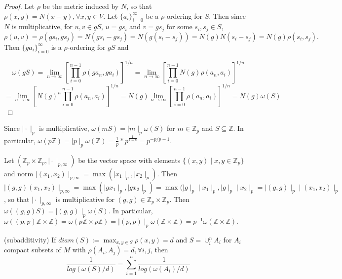 \begin{proof}
	Let $\rho$ be the metric induced by $N$, so that $\rho(x,y) = N(x-y), \forall x,y \in V$. Let $\{a_i\}_{i=0}^\infty$ be a $\rho$-ordering for $S$. Then since $N$ is multiplicative, for $u, v \in gS$, $u=gs_i$ and $v=gs_j$ for some $s_i, s_j \in S$,  $$\rho(u, v) = \rho(gs_i, gs_j) =N(gs_i - gs_j) = N(g(s_i - s_j)) = N(g)N(s_i - s_j) = N(g)\rho(s_i,s_j).$$
	Then $\{ga_i\}_{i=0}^\infty$ is a $\rho$-ordering for $gS$ and 
	
	$$\omega(gS) = \lim_{n\to\infty} [\prod_{i=0}^{n-1} \rho(ga_n,ga_i)]^{1/n} 
	= \lim_{n\to\infty} [\prod_{i=0}^{n-1} N(g)\rho(a_n,a_i)]^{1/n} $$
	$$= \lim_{n\to\infty} [N(g)^n\prod_{i=0}^{n-1} \rho(a_n,a_i)]^{1/n} = N(g) \lim_{n\to\infty} [\prod_{i=0}^{n-1} \rho(a_n,a_i)]^{1/n} = N(g) \omega(S)$$
\end{proof}


\begin{example}
	Since $\mid \cdot \mid_p$ is multiplicative, $\omega(mS) = \mid m \mid_p  \omega(S)$ for $m \in \mathbb{Z}_p$ and $S \subseteq \mathbb{Z}$. In particular, $\omega(p\mathbb{Z}) = \mid p \mid_p \omega(\mathbb{Z}) = \frac{1}{p}*p^{\frac{1}{1-p}} = p^{-p/p-1}.$
\end{example}

\begin{example}
	Let $(\mathbb{Z}_p \times \mathbb{Z}_p, \mid \cdot \mid_{p,\infty})$ be the vector space with elements $\{(x,y)\mid x,y \in \mathbb{Z}_p\}$ and norm $ \mid (x_1,x_2) \mid_{p,\infty} = \max(\mid x_1 \mid_p,\mid x_2 \mid_p ).$ Then $\mid (g,g)(x_1,x_2) \mid_{p,\infty} = \max(\mid gx_1 \mid_p,\mid gx_2 \mid_p ) = \max(\mid g \mid_p \mid x_1 \mid_p,\mid g \mid_p \mid x_2 \mid_p=\mid (g,g) \mid_p \mid (x_1,x_2) \mid_p$, so that $\mid \cdot \mid_{p,\infty} $ is multiplicative for $(g,g) \in \mathbb{Z}_p \times \mathbb{Z}_p$. Then $\omega((g,g)S) = \mid (g,g) \mid_p\omega(S)$. In particular, $\omega((p,p)\mathbb{Z} \times \mathbb{Z}) =\omega(p\mathbb{Z} \times p\mathbb{Z})=\mid (p,p) \mid_p \omega(\mathbb{Z} \times \mathbb{Z}) =
	p^{-1} \omega(\mathbb{Z} \times \mathbb{Z}). $
\end{example}


\begin{proposition*}
	\cite{kj}(subadditivity) If  $diam(S) := \max_{x,y \in S} \rho(x,y)=d$ and $S=\cup_i^n A_i$ for $A_i$ compact subsets of $M$ with $\rho(A_i, A_j)=d, \forall i,j$, then \[\frac{1}{log(\omega(S)/d) } = \sum_{i=1}^n \frac{1}{log(\omega(A_i)/d)}\] 
\end{proposition*}


